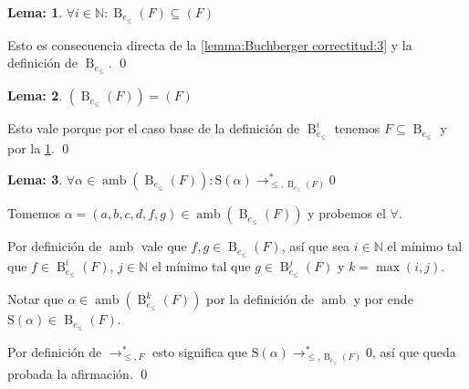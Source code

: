 \documentclass[12pt]{report}
\theoremstyle{customstyle}
\newtheorem{lemma}{Lema:}[chapter]
\renewenvironment{proof}[1][\proofname]{{\bfseries #1: }}{\qed} %
\theoremstyle{factstyle}
\DeclareMathOperator{\amb}{amb}
\renewcommand{\S}{\text{S}}
\DeclareMathOperator{\B}{B}
\begin{document}
\begin{lemma}\label{lemma:Buchberger correctitud:4}
  $∀i ∈ ℕ : \B_{e_≤}(F) ⊆ (F)$
\end{lemma}
\begin{proof}
  Esto es consecuencia directa de la \cref{lemma:Buchberger correctitud:3} y la definición de $\B_{e_≤}$.
\end{proof}

\begin{lemma}\label{lemma:Buchberger correctitud:5}
  $(\B_{e_≤}(F)) = (F)$
\end{lemma}
\begin{proof}
  Esto vale porque por el caso base de la definición de $\B_{e_≤}^i$ tenemos $F ⊆ \B_{e_≤}$ y por la \cref{lemma:Buchberger correctitud:4}.
\end{proof}

\begin{lemma}\label{lemma:Buchberger correctitud:6}
  $∀α ∈ \amb(\B_{e_≤}(F)) : \S(α) →^*_{≤, \B_{e_≤}(F)} 0$
\end{lemma}
\begin{proof}
  Tomemos $α = (a, b, c, d, f, g) ∈ \amb(\B_{e_≤}(F))$ y probemos el $∀$.

  Por definición de $\amb$ vale que $f, g ∈ \B_{e_≤}(F)$, así que sea $i ∈ ℕ$ el mínimo tal que $f ∈ \B_{e_≤}^i(F)$, $j ∈ ℕ$ el mínimo tal que $g ∈ \B_{e_≤}^j(F)$ y $k = \max(i, j)$.

  Notar que $α ∈ \amb(\B_{e_≤}^k(F))$ por la definición de $\amb$ y por ende $\S(α) ∈ \B_{e_≤}(F)$.

  Por definición de $→^*_{≤, F}$ esto significa que $\S(α) →^*_{≤, \B_{e_≤}(F)} 0$, así que queda probada la afirmación.
\end{proof}
\end{document}
